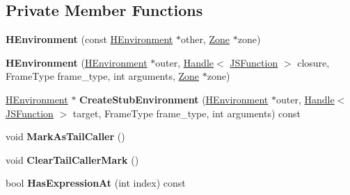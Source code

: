 \subsection*{Private Member Functions}
\begin{DoxyCompactItemize}
\item 
{\bfseries H\+Environment} (const \hyperlink{classv8_1_1internal_1_1_h_environment}{H\+Environment} $\ast$other, \hyperlink{classv8_1_1internal_1_1_zone}{Zone} $\ast$zone)\hypertarget{classv8_1_1internal_1_1_h_environment_a628a4952512900bff938cb37475405a5}{}\label{classv8_1_1internal_1_1_h_environment_a628a4952512900bff938cb37475405a5}

\item 
{\bfseries H\+Environment} (\hyperlink{classv8_1_1internal_1_1_h_environment}{H\+Environment} $\ast$outer, \hyperlink{classv8_1_1internal_1_1_handle}{Handle}$<$ \hyperlink{classv8_1_1internal_1_1_j_s_function}{J\+S\+Function} $>$ closure, Frame\+Type frame\+\_\+type, int arguments, \hyperlink{classv8_1_1internal_1_1_zone}{Zone} $\ast$zone)\hypertarget{classv8_1_1internal_1_1_h_environment_ad7793675d4633adbd3c3e90b6e5fd696}{}\label{classv8_1_1internal_1_1_h_environment_ad7793675d4633adbd3c3e90b6e5fd696}

\item 
\hyperlink{classv8_1_1internal_1_1_h_environment}{H\+Environment} $\ast$ {\bfseries Create\+Stub\+Environment} (\hyperlink{classv8_1_1internal_1_1_h_environment}{H\+Environment} $\ast$outer, \hyperlink{classv8_1_1internal_1_1_handle}{Handle}$<$ \hyperlink{classv8_1_1internal_1_1_j_s_function}{J\+S\+Function} $>$ target, Frame\+Type frame\+\_\+type, int arguments) const \hypertarget{classv8_1_1internal_1_1_h_environment_a9f094cbc1127231d8faadab2d5b96712}{}\label{classv8_1_1internal_1_1_h_environment_a9f094cbc1127231d8faadab2d5b96712}

\item 
void {\bfseries Mark\+As\+Tail\+Caller} ()\hypertarget{classv8_1_1internal_1_1_h_environment_afa7866aed561edc5cae5227b7ce27169}{}\label{classv8_1_1internal_1_1_h_environment_afa7866aed561edc5cae5227b7ce27169}

\item 
void {\bfseries Clear\+Tail\+Caller\+Mark} ()\hypertarget{classv8_1_1internal_1_1_h_environment_aa7960a053d6128fdc758286b2a42a06a}{}\label{classv8_1_1internal_1_1_h_environment_aa7960a053d6128fdc758286b2a42a06a}

\item 
bool {\bfseries Has\+Expression\+At} (int index) const \hypertarget{classv8_1_1internal_1_1_h_environment_ae4a63ecd365acb362775bb1fae5c095b}{}\label{classv8_1_1internal_1_1_h_environment_ae4a63ecd365acb362775bb1fae5c095b}


\end{DoxyCompactItemize}
